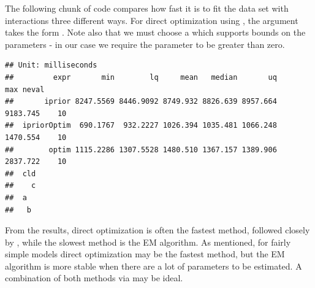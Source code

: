 The following chunk of code compares how fast it is to fit the  data set with interactions three different ways. For direct optimization using , the  argument takes the form . Note also that we must choose a  which supports bounds on the parameters - in our case we require the  parameter to be greater than zero.

\begin{knitrout}
\color{fgcolor}\begin{kframe}
\begin{alltt}
 \hlkwb{<-}  \hlopt{~}  \hlopt{+}  \hlopt{+} \hlopt{:}  
\hlstd{(}
        \hlstd{=}   \hlstd{=} \hlstd{(} \hlstd{=} \hlstd{)),}
   \hlstd{=}   \hlstd{=} \hlstd{(} \hlstd{=} \hlstd{)),}
         \hlstd{=} \hlstd{(} \hlstd{=} \hlstd{(}\hlstd{(}\hlstd{)),}    
                       \hlstd{=} \hlstd{,}  \hlstd{=} \hlstd{(}\hlopt{-}\hlstd{,} \hlopt{-}\hlstd{,} \hlstd{)),}
 \hlstd{=} \hlstd{)}
\end{alltt}
\begin{verbatim}
## Unit: milliseconds
##         expr       min        lq     mean   median       uq      max neval
##       iprior 8247.5569 8446.9092 8749.932 8826.639 8957.664 9183.745    10
##  ipriorOptim  690.1767  932.2227 1026.394 1035.481 1066.248 1470.554    10
##        optim 1115.2286 1307.5528 1480.510 1367.157 1389.906 2837.722    10
##  cld
##    c
##  a  
##   b
\end{verbatim}
\end{kframe}
\end{knitrout}

From the results, direct optimization is often the fastest method, followed closely by , while the slowest method is the EM algorithm. As mentioned, for fairly simple models direct optimization may be the fastest method, but the EM algorithm is more stable when there are a lot of  parameters to be estimated. A combination of both methods via  may be ideal.

